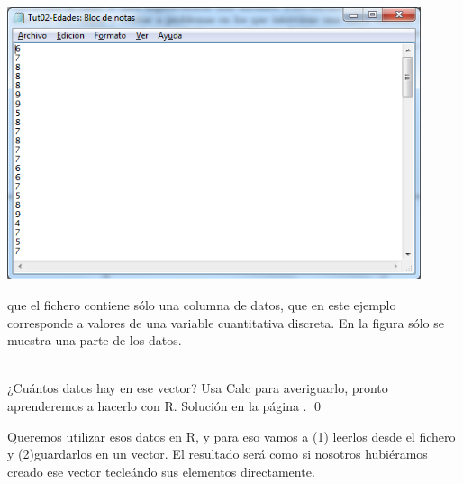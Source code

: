 \documentclass[10pt,a4paper]{article}\usepackage[]{graphicx}\usepackage[]{color}
\newcounter {cont01}
\begin{document}
    \begin{center}
    \includegraphics[height=8cm]{../fig/Tut02-06.png}
    \end{center}

que el fichero contiene  sólo una columna de datos, que en este ejemplo corresponde a valores de una variable cuantitativa discreta. En la figura sólo se muestra una parte de los datos.

\begin{ejercicio}
\label{tut02:ejercicio03}
\quad\\
¿Cuántos datos hay en ese vector? Usa Calc para averiguarlo, pronto aprenderemos a hacerlo con R.
Solución en la página \pageref{tut02:ejercicio03:sol}.
\qed
\end{ejercicio}

Queremos utilizar esos datos en R, y para eso vamos a (1) leerlos desde el fichero y (2)guardarlos en un vector. El resultado será como si nosotros hubiéramos creado ese vector tecleándo sus elementos directamente.
\end{document}

